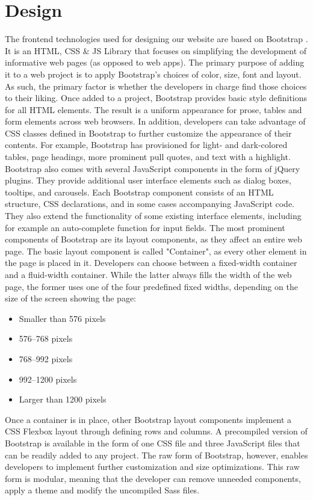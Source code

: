 \section{Design}


The frontend technologies used for designing our website are based on Bootstrap  \cite{bootstrap}. It is an HTML, CSS \& JS Library that focuses on simplifying the development of informative web pages (as opposed to web apps). The primary purpose of adding it to a web project is to apply Bootstrap's choices of color, size, font and layout. As such, the primary factor is whether the developers in charge find those choices to their liking. Once added to a project, Bootstrap provides basic style definitions for all HTML elements. The result is a uniform appearance for prose, tables and form elements across web browsers. In addition, developers can take advantage of CSS classes defined in Bootstrap to further customize the appearance of their contents. For example, Bootstrap has provisioned for light- and dark-colored tables, page headings, more prominent pull quotes, and text with a highlight.
Bootstrap also comes with several JavaScript components in the form of jQuery plugins. They provide additional user interface elements such as dialog boxes, tooltips, and carousels. Each Bootstrap component consists of an HTML structure, CSS declarations, and in some cases accompanying JavaScript code. They also extend the functionality of some existing interface elements, including for example an auto-complete function for input fields.
The most prominent components of Bootstrap are its layout components, as they affect an entire web page. The basic layout component is called "Container", as every other element in the page is placed in it. Developers can choose between a fixed-width container and a fluid-width container. While the latter always fills the width of the web page, the former uses one of the four predefined fixed widths, depending on the size of the screen showing the page:
\begin{itemize}
\item Smaller than 576 pixels
\item 576–768 pixels
\item 768–992 pixels
\item 992–1200 pixels
\item Larger than 1200 pixels
\end{itemize}
Once a container is in place, other Bootstrap layout components implement a CSS Flexbox layout through defining rows and columns.
A precompiled version of Bootstrap is available in the form of one CSS file and three JavaScript files that can be readily added to any project. The raw form of Bootstrap, however, enables developers to implement further customization and size optimizations. This raw form is modular, meaning that the developer can remove unneeded components, apply a theme and modify the uncompiled Sass files.

